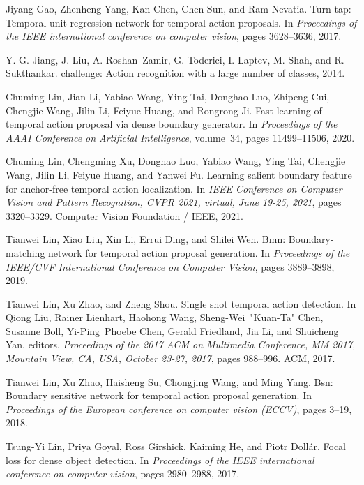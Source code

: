 \documentclass[10pt,twocolumn,letterpaper]{article}
\begin{document}
{\begin{thebibliography}{10}
Jiyang Gao, Zhenheng Yang, Kan Chen, Chen Sun, and Ram Nevatia.
\newblock Turn tap: Temporal unit regression network for temporal action
  proposals.
\newblock In {\em Proceedings of the IEEE international conference on computer
  vision}, pages 3628--3636, 2017.

Y.-G. Jiang, J. Liu, A. Roshan~Zamir, G. Toderici, I. Laptev, M. Shah, and R.
  Sukthankar.
 challenge: Action recognition with a large number of
  classes, 2014.

Chuming Lin, Jian Li, Yabiao Wang, Ying Tai, Donghao Luo, Zhipeng Cui, Chengjie
  Wang, Jilin Li, Feiyue Huang, and Rongrong Ji.
\newblock Fast learning of temporal action proposal via dense boundary
  generator.
\newblock In {\em Proceedings of the AAAI Conference on Artificial
  Intelligence}, volume~34, pages 11499--11506, 2020.

Chuming Lin, Chengming Xu, Donghao Luo, Yabiao Wang, Ying Tai, Chengjie Wang,
  Jilin Li, Feiyue Huang, and Yanwei Fu.
\newblock Learning salient boundary feature for anchor-free temporal action
  localization.
\newblock In {\em {IEEE} Conference on Computer Vision and Pattern Recognition,
  {CVPR} 2021, virtual, June 19-25, 2021}, pages 3320--3329. Computer Vision
  Foundation / {IEEE}, 2021.

Tianwei Lin, Xiao Liu, Xin Li, Errui Ding, and Shilei Wen.
\newblock Bmn: Boundary-matching network for temporal action proposal
  generation.
\newblock In {\em Proceedings of the IEEE/CVF International Conference on
  Computer Vision}, pages 3889--3898, 2019.

Tianwei Lin, Xu Zhao, and Zheng Shou.
\newblock Single shot temporal action detection.
\newblock In Qiong Liu, Rainer Lienhart, Haohong Wang, Sheng{-}Wei~"Kuan{-}Ta"
  Chen, Susanne Boll, Yi{-}Ping~Phoebe Chen, Gerald Friedland, Jia Li, and
  Shuicheng Yan, editors, {\em Proceedings of the 2017 {ACM} on Multimedia
  Conference, {MM} 2017, Mountain View, CA, USA, October 23-27, 2017}, pages
  988--996. {ACM}, 2017.

Tianwei Lin, Xu Zhao, Haisheng Su, Chongjing Wang, and Ming Yang.
\newblock Bsn: Boundary sensitive network for temporal action proposal
  generation.
\newblock In {\em Proceedings of the European conference on computer vision
  (ECCV)}, pages 3--19, 2018.

Tsung-Yi Lin, Priya Goyal, Ross Girshick, Kaiming He, and Piotr Doll{\'a}r.
\newblock Focal loss for dense object detection.
\newblock In {\em Proceedings of the IEEE international conference on computer
  vision}, pages 2980--2988, 2017.


\end{thebibliography}}
\end{document}
